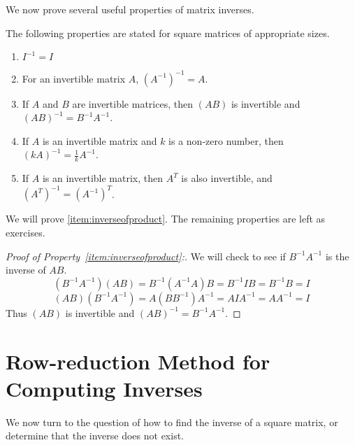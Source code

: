 \documentclass{ximera}
\begin{document}
We now prove several useful properties of matrix inverses.

\begin{theorem}\label{th:invprop} The following properties are stated for square matrices of appropriate sizes.
\begin{enumerate}
\item \label{item:inverseofid} $I^{-1}=I$
\item \label{item:inverseofinverse} For an invertible matrix $A$, $(A^{-1})^{-1}=A$.
\item \label{item:inverseofproduct} If $A$ and $B$ are invertible matrices, then $(AB)$ is invertible and $(AB)^{-1}=B^{-1}A^{-1}$.
\item \label{item:inversekA} If $A$ is an invertible matrix and $k$ is a non-zero number, then $(kA)^{-1}=\frac{1}{k}A^{-1}$.
\item \label{item:inversetranspose} If $A$ is an invertible matrix, then $A^T$ is also invertible, and $(A^T)^{-1}=(A^{-1})^T$.
\end{enumerate}
\end{theorem}
We will prove \ref{item:inverseofproduct}.  The remaining properties are left as exercises.
\begin{proof}[Proof of Property~\ref{item:inverseofproduct}:]
We will check to see if $B^{-1}A^{-1}$ is the inverse of $AB$.
$$(B^{-1}A^{-1})(AB)=B^{-1}(A^{-1}A)B=B^{-1}IB=B^{-1}B=I$$
$$(AB)(B^{-1}A^{-1})=A(BB^{-1})A^{-1}=AIA^{-1}=AA^{-1}=I$$
Thus $(AB)$ is invertible and $(AB)^{-1}=B^{-1}A^{-1}$.
\end{proof}


\section*{Row-reduction Method for Computing Inverses}
We now turn to the question of how to find the inverse of a square matrix, or determine that the inverse does not exist.  
\end{document}
